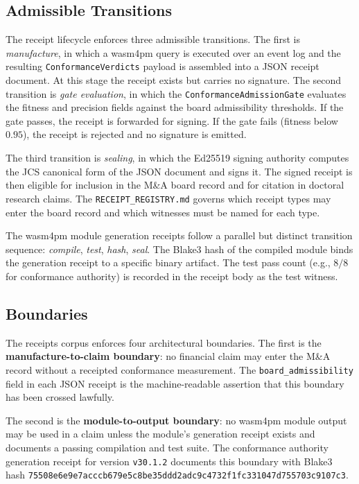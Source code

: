 \subsection{Admissible Transitions}
\label{sec:receipts-architecture-transitions}

The receipt lifecycle enforces three admissible transitions. The first is \emph{manufacture},
in which a wasm4pm query is executed over an event log and the resulting
\texttt{ConformanceVerdicts} payload is assembled into a JSON receipt document. At this stage
the receipt exists but carries no signature. The second transition is \emph{gate evaluation},
in which the \texttt{ConformanceAdmissionGate} evaluates the fitness and precision fields against
the board admissibility thresholds. If the gate passes, the receipt is forwarded for signing.
If the gate fails (fitness below $0.95$), the receipt is rejected and no signature is emitted.

The third transition is \emph{sealing}, in which the Ed25519 signing authority computes the
JCS canonical form of the JSON document and signs it. The signed receipt is then eligible for
inclusion in the M\&A board record and for citation in doctoral research claims. The
\texttt{RECEIPT\_REGISTRY.md} governs which receipt types may enter the board record and
which witnesses must be named for each type.

The wasm4pm module generation receipts follow a parallel but distinct transition sequence:
\emph{compile}, \emph{test}, \emph{hash}, \emph{seal}. The Blake3 hash of the compiled
module binds the generation receipt to a specific binary artifact. The test pass count
(e.g., $8/8$ for conformance authority) is recorded in the receipt body as the test witness.

\subsection{Boundaries}
\label{sec:receipts-architecture-boundaries}

The receipts corpus enforces four architectural boundaries. The first is the
\textbf{manufacture-to-claim boundary}: no financial claim may enter the M\&A record without
a receipted conformance measurement. The \texttt{board\_admissibility} field in each JSON
receipt is the machine-readable assertion that this boundary has been crossed lawfully.

The second is the \textbf{module-to-output boundary}: no wasm4pm module output may be used
in a claim unless the module's generation receipt exists and documents a passing compilation
and test suite. The conformance authority generation receipt for version \texttt{v30.1.2}
documents this boundary with Blake3 hash
\texttt{75508e6e9e7acccb679e5c8be35ddd2adc9c4732f1fc331047d755703c9107c3}.

